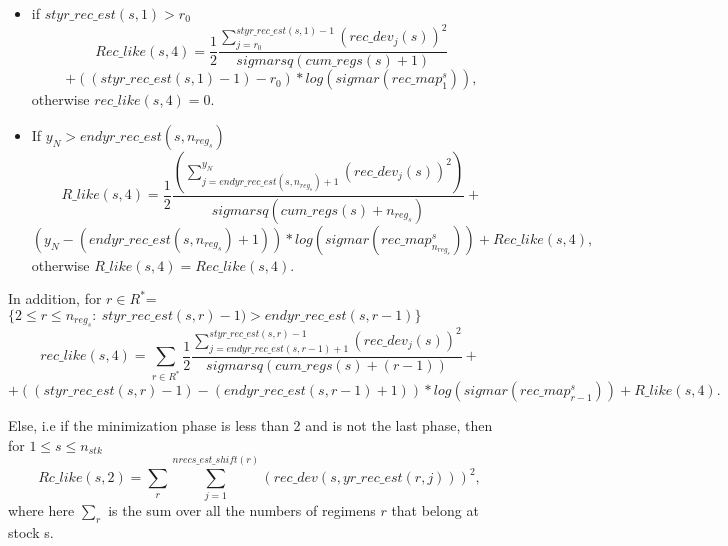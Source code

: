 \documentclass{article}
\begin{document}
\begin{itemize}
    \item if $styr\_rec\_est(s,1)>r_0$
    \begin{equation}
        Rec\_like(s,4) =  \dfrac{1}{2}\dfrac{\displaystyle\sum_{j=r_0}^{styr\_rec\_est(s,1)-1}(rec\_dev_j(s))^2}{sigmarsq(cum\_regs(s)+1)} 
    \end{equation}
    \begin{equation*}
        + ((styr\_rec\_est(s,1)-1)-r_0)*log(sigmar(rec\_map^s_1)),
    \end{equation*}
    otherwise $rec\_like(s,4)=0$.
    \item If $y_N > endyr\_rec\_est(s,n_{reg_s})$
    \begin{equation}
        R\_like(s,4) =  \dfrac{1}{2}\dfrac{\displaystyle\left(\sum_{j=endyr\_rec\_est(s,n_{reg_s})+1}^{y_N}(rec\_dev_j(s) )^2\right)}{sigmarsq(cum\_regs(s)+n_{reg_s})} + 
    \end{equation}
    \begin{equation*}
        (y_N-(endyr\_rec\_est(s,n_{reg_s})+1))*log(sigmar(rec\_map^s_{n_{reg_s}})) + Rec\_like(s,4),
    \end{equation*}
    otherwise $R\_like(s,4)=Rec\_like(s,4)$.
\end{itemize}
In addition, for $r\in R^*$=$\{2\leq r \leq n_{reg_s}: \ styr\_rec\_est(s,r)-1) > endyr\_rec\_est(s,r-1)\}$
\begin{equation}
    rec\_like(s,4) =  \sum_{r\in R^*}\dfrac{1}{2}\dfrac{\displaystyle\sum_{j=endyr\_rec\_est(s,r-1)+1}^{styr\_rec\_est(s,r)-1}( rec\_dev_j(s))^2}{sigmarsq(cum\_regs(s)+(r-1))} + 
\end{equation}
\begin{equation*}
    + ((styr\_rec\_est(s,r)-1)-(endyr\_rec\_est(s,r-1)+1))*log(sigmar(rec\_map^s_{r-1})) + R\_like(s,4).
\end{equation*}
















Else, i.e if the minimization phase is less than 2 and is not the last phase, then for $1\leq s \leq n_{stk}$
\begin{equation}
    Rc\_like(s,2) = \sum_{r}\sum_{j=1}^{nrecs\_est\_shift(r)}(rec\_dev(s,yr\_rec\_est(r,j)))^2, 
\end{equation} 
where here $\sum_{r}$ is the sum over all the numbers of regimens $r$ that belong  at stock s.\\
\end{document}
